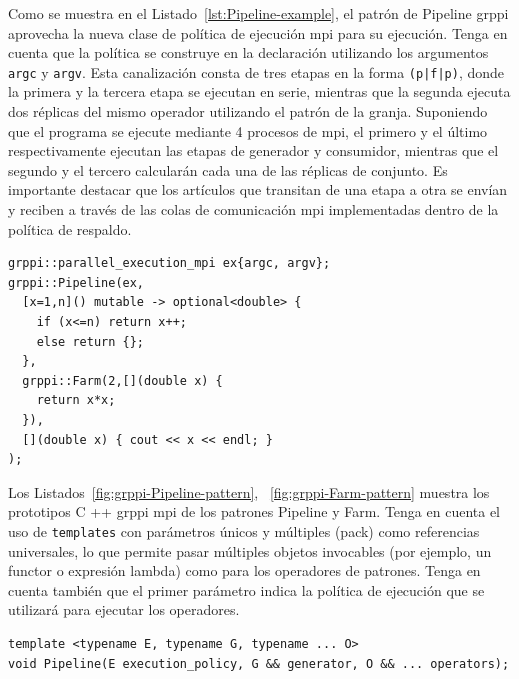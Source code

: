 Como se muestra en el Listado~\ref{lst:Pipeline-example}, el patrón de Pipeline \acrshort{grppi} aprovecha la nueva clase de política de ejecución \acrshort{mpi} para su ejecución. Tenga en cuenta que la política se construye en la declaración utilizando los argumentos \texttt{argc} y \texttt{argv}. Esta canalización consta de tres etapas en la forma \texttt{(p|f|p)}, donde la primera y la tercera etapa se ejecutan en serie, mientras que la segunda ejecuta dos réplicas del mismo operador utilizando el patrón de la granja. Suponiendo que el programa se ejecute mediante 4 procesos de \acrshort{mpi}, el primero y el último respectivamente ejecutan las etapas de generador y consumidor, mientras que el segundo y el tercero calcularán cada una de las réplicas de conjunto. Es importante destacar que los artículos que transitan de una etapa a otra se envían y reciben a través de las colas de comunicación \acrshort{mpi} implementadas dentro de la política de respaldo.

\vspace{0.35cm}
\begin{lstlisting}[linewidth=1\columnwidth,caption={Ejemplo de Pipeline \acrshort{grppi} distribuido.},label={lst:Pipeline-example},frame=single]
grppi::parallel_execution_mpi ex{argc, argv};
grppi::Pipeline(ex, 
  [x=1,n]() mutable -> optional<double> { 
    if (x<=n) return x++;
    else return {}; 
  },
  grppi::Farm(2,[](double x) {
    return x*x;
  }),
  [](double x) { cout << x << endl; }
);
\end{lstlisting}
\vspace{0.35cm}

Los Listados~\ref{fig:grppi-Pipeline-pattern}, ~\ref{fig:grppi-Farm-pattern} muestra los prototipos C ++ \acrshort{grppi} \acrshort{mpi} de los patrones Pipeline y Farm. Tenga en cuenta el uso de \texttt{templates} con parámetros únicos y múltiples (pack) como referencias universales, lo que permite pasar múltiples objetos invocables (por ejemplo, un functor o expresión lambda) como para los operadores de patrones. Tenga en cuenta también que el primer parámetro indica la política de ejecución que se utilizará para ejecutar los operadores.

\vspace{0.35cm}
\begin{lstlisting}[linewidth=1\columnwidth,caption={Interfaz patrón Pipeline en \acrshort{grppi} \acrshort{mpi}.},label={fig:grppi-Pipeline-pattern},frame=single]
template <typename E, typename G, typename ... O>
void Pipeline(E execution_policy, G && generator, O && ... operators);
\end{lstlisting}
\vspace{0.35cm}

